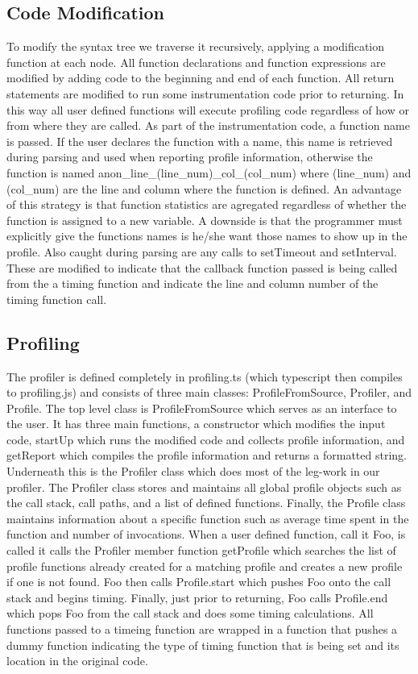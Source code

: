 \documentclass[11pt]{article}
\begin{document}
\subsection{Code Modification}
	
	To modify the syntax tree we traverse it recursively, applying a modification function at each node.
All function declarations and function expressions are modified by adding code to the beginning and end 
of each function. All return statements are modified to run some instrumentation code prior to returning. 
In this way all user defined functions will execute profiling code regardless of how or from where 
they are called. As part of the instrumentation code, a function name is passed. If the user declares 
the function with a name, this name is retrieved during parsing and used when reporting profile information, 
otherwise the function is named anon\_line\_(line\_num)\_col\_(col\_num) where (line\_num) and (col\_num) are the line 
and column where the function is defined. An advantage of this strategy is that function statistics are 
agregated regardless of whether the function is assigned to a new variable. A downside is that the programmer 
must explicitly give the functions names is he/she want those names to show up in the profile. Also caught 
during parsing are any calls to setTimeout and setInterval. These are modified to 
indicate that the callback function passed is being called from the a timing function and indicate the 
line and column number of the timing function call. 

\subsection{Profiling}

	The profiler is defined completely in profiling.ts (which typescript then compiles to profiling.js) 
and consists of three main classes: ProfileFromSource, Profiler, and Profile. The top level class 
is ProfileFromSource which serves as an interface to the user. It has three main functions, a constructor 
which modifies the input code, startUp which runs the modified code and collects profile information, 
and getReport which compiles the profile information and returns a formatted string. Underneath this 
is the Profiler class which does most of the leg-work in our profiler. The Profiler class stores and 
maintains all global profile objects such as the call stack, call paths, and a list of defined functions. 
Finally, the Profile class maintains information about a specific function such as average time spent in 
the function and number of invocations. When a user defined function, call it Foo, is called it calls the Profiler member 
function getProfile which searches the list of profile functions already created for a matching profile 
and creates a new profile if one is not found. Foo then calls Profile.start which pushes Foo onto the 
call stack and begins timing. Finally, just prior to returning, Foo calls Profile.end which pops Foo from 
the call stack and does some timing calculations. All functions passed to a timeing function are wrapped in 
a function that pushes a dummy function indicating the type of timing function that is being set and its 
location in the original code.
\end{document}
